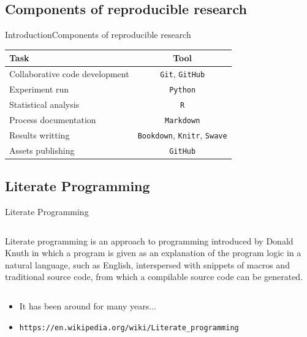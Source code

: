 \documentclass{beamer}
\begin{document}
\subsection{Components of reproducible research}

\begin{frame}{Introduction}{Components of reproducible research}
	\begin{table}
	\centering
	\begin{tabular}{|l|c|}\hline
	\textbf{Task} & \textbf{Tool} \\ \hline
	Collaborative code development & \texttt{Git}, \texttt{GitHub}  \\ \hline
	Experiment run & \texttt{Python}   \\ \hline
	Statistical analysis  & \texttt{R}   \\ \hline
	Process documentation & \texttt{Markdown}   \\ \hline
	Results writting	& \texttt{Bookdown}, \texttt{Knitr}, \texttt{Swave} \\ \hline
	Assets publishing & \texttt{GitHub}\\ \hline

	\end{tabular}
	\end{table}
\end{frame}




\subsection[Literate Programming]{Literate Programming}

\begin{frame}{Literate Programming}
	\begin{center}
	\begin{columns}
	\begin{block}{}
	\begin{center}
	Literate programming is an approach to programming introduced by Donald Knuth in which a program is given as an explanation of the program logic in a natural language, such as English, interspersed with snippets of macros and traditional source code, from which a compilable source code can be generated.
	\end{center}
	\end{block}
	\end{columns}
	\end{center}
	
      \begin{itemize}
	\item It has been around for many years...
	\item \texttt{https://en.wikipedia.org/wiki/Literate\_programming}
      \end{itemize}
\end{frame}
\end{document}
